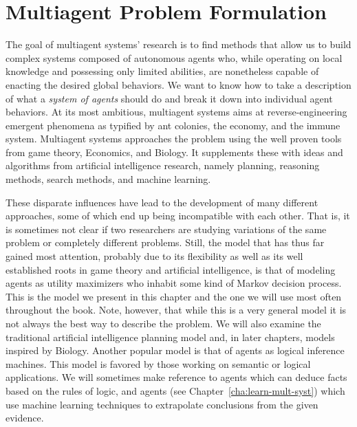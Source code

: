 \chapter{Multiagent Problem Formulation}
\label{cha:problemfor}


The goal of multiagent systems' research is to find methods that allow
us to build complex systems composed of autonomous agents who, while
operating on local knowledge and possessing only limited abilities,
are nonetheless capable of enacting the desired global behaviors. We
want to know how to take a description of what a \emph{system of
  agents} should do and break it down into individual agent behaviors.
At its most ambitious, multiagent systems aims at reverse-engineering
emergent phenomena as typified by ant colonies, the economy, and the
immune system. Multiagent systems approaches the problem using the
well proven tools from game theory, Economics, and Biology. It
supplements these with ideas and algorithms from artificial
intelligence research, namely planning, reasoning methods, search
methods, and machine learning.

 These disparate influences
have lead to the development of many different approaches, some of
which end up being incompatible with each other.  That is, it is
sometimes not clear if two researchers are studying variations of the
same problem or completely different problems.  Still, the model that
has thus far gained most attention, probably due to its flexibility as
well as its well established roots in game theory and artificial
intelligence, is that of modeling agents as utility maximizers who
inhabit some kind of Markov decision process.  This is the model we
present in this chapter and the one we will use most often throughout
the book. Note, however, that while this is a very general model it is
not always the best way to describe the problem.  We will also examine
the traditional artificial intelligence planning model and, in later
chapters, models inspired by Biology. Another popular model is that of
agents as logical inference machines. This model is favored by those
working on semantic or logical applications. We will sometimes make
reference to  agents which can deduce facts based on the
rules of logic, and  agents (see
Chapter~\ref{cha:learn-mult-syst}) which use machine learning
techniques to extrapolate conclusions from the given evidence.



